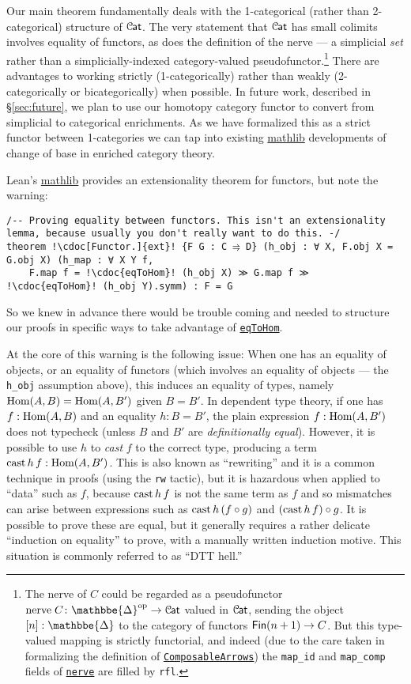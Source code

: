 \documentclass[a4paper,UKenglish,cleveref, autoref, thm-restate]{lipics-v2021}
\newcommand{\op}{\textup{op}}
\newcommand{\nerve}{\textup{nerve}}
\newcommand{\cast}{\textup{cast}}
\newcommand{\Hom}{\textup{Hom}}
\newcommand{\cat}[1]{\textup{\textsf{#1}}}%
\newcommand{\1}{\mathbbe{1}}
\newcommand{\2}{\mathbbe{2}}
\newcommand{\3}{\mathbbe{3}}
\newcommand{\DDelta}{\mathbbe{\Delta}}
\newcommand{\Fin}{\cat{Fin}}
\newcommand{\Cat}{\mathcal{C}{\kern-.75pt}\cat{at}}
\newcommand{\libmathlib}{\href{https://github.com/leanprover-community/mathlib}{\textsf{mathlib}}}
\newcommand{\cdoc}[2][]{\href{https://leanprover-community.github.io/mathlib4_docs/find/?pattern=CategoryTheory.#1#2\#doc}{\texttt{#2}}}
\begin{document}
Our main theorem fundamentally deals with the 1-categorical (rather than 2-categorical) structure of $\Cat$. The very statement that $\Cat$ has small colimits involves equality of functors, as does the definition of the nerve --- a simplicial \emph{set} rather than a simplicially-indexed category-valued pseudofunctor.\footnote{The nerve of $C$ could be regarded as a pseudofunctor $\nerve\;C \colon \DDelta^\op \to \Cat$ valued in $\Cat$, sending the object $[n] : \DDelta$ to the category of functors $\Fin(n+1) \to C$. But this type-valued mapping is strictly functorial, and indeed (due to the care taken in formalizing the definition of \cdoc{ComposableArrows}) the \lstinline|map_id| and \lstinline|map_comp| fields of \cdoc{nerve} are filled by \lstinline|rfl|.} There are advantages to working strictly (1-categorically) rather than weakly (2-categorically or bicategorically) when possible. In future work, described in \S\ref{sec:future}, we plan to use our homotopy category functor to convert from simplicial to categorical enrichments. As we have formalized this as a strict functor between 1-categories we can tap into existing \libmathlib{} developments of change of base in enriched category theory.

Lean's \libmathlib{} provides an extensionality theorem for functors, but note the warning:
\begin{lstlisting}
/-- Proving equality between functors. This isn't an extensionality lemma, because usually you don't really want to do this. -/
theorem !\cdoc[Functor.]{ext}! {F G : C ⥤ D} (h_obj : ∀ X, F.obj X = G.obj X) (h_map : ∀ X Y f,
    F.map f = !\cdoc{eqToHom}! (h_obj X) ≫ G.map f ≫ !\cdoc{eqToHom}! (h_obj Y).symm) : F = G
\end{lstlisting}
So we knew in advance there would be trouble coming and needed to structure our proofs in specific ways to take advantage of \cdoc{eqToHom}.

At the core of this warning is the following issue: When one has an equality of objects, or an equality of functors (which involves an equality of objects --- the \lstinline|h_obj| assumption above), this induces an equality of types, namely $\Hom(A,B)=\Hom(A,B')$ given $B=B'$. In dependent type theory, if one has $f:\Hom(A,B)$ and an equality $h:B=B'$, the plain expression $f:\Hom(A,B')$ does not typecheck (unless $B$ and $B'$ are \emph{definitionally equal}). However, it is possible to use $h$ to \emph{cast} $f$ to the correct type, producing a term $\cast\,h\,f:\Hom(A,B')$. This is also known as ``rewriting'' and it is a common technique in proofs (using the \lstinline|rw| tactic), but it is hazardous when applied to ``data'' such as $f$, because $\cast\,h\,f$ is not the same term as $f$ and so mismatches can arise between expressions such as $\cast\,h\,(f\circ g)$ and $(\cast\,h\,f)\circ g$. It is possible to prove these are equal, but it generally requires a rather delicate ``induction on equality'' to prove, with a manually written induction motive. This situation is commonly referred to as ``DTT hell.''
\end{document}

